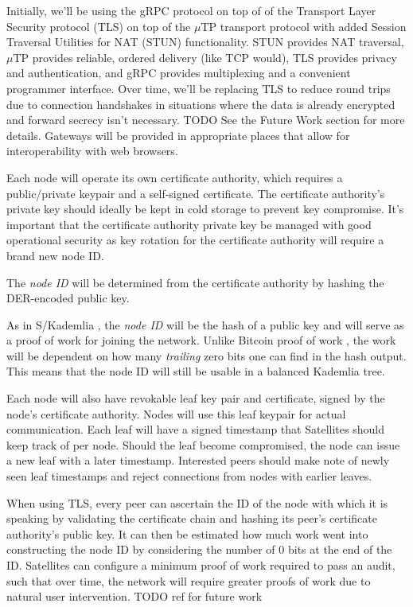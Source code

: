 \documentclass[11pt,fleqn,openany]{book}
\newcommand{\todo}[1]{{\color{red} TODO #1 }}
\begin{document}
Initially, we'll be using the gRPC \cite{grpc} protocol on top of of the
Transport Layer Security protocol (TLS) on top of the $\mu$TP
\cite{utp} transport protocol with added Session Traversal Utilities for NAT
(STUN) functionality. STUN provides NAT traversal, $\mu$TP provides reliable,
ordered delivery (like TCP would), TLS provides privacy and authentication,
and gRPC provides multiplexing and a convenient programmer interface.
Over time, we'll be replacing TLS to
reduce round trips due to connection handshakes in situations where the data is
already encrypted and forward secrecy isn't necessary. \todo{} See the Future
Work section for more details. Gateways will be provided in appropriate places
that allow for interoperability with web browsers.

Each node will operate its own certificate authority, which requires a
public/private keypair and a self-signed certificate. The certificate
authority's private key should ideally be kept in cold storage to prevent key
compromise.
It's important that the certificate authority private key be managed with good
operational security as key rotation for the certificate authority will require
a brand new node ID.

The {\em node ID} will be determined from the certificate authority
by hashing the DER-encoded public key.

As in S/Kademlia \cite{skad}, the {\em node ID} will be the hash of a public key
and will serve as a proof of work for joining the network. Unlike Bitcoin proof
of work \cite{bitcoin}, the work will be dependent on how many {\em trailing}
zero bits one can find in the hash output. This means that the node ID will
still be usable in a balanced Kademlia \cite{kad} tree.

Each node will also have revokable leaf key pair and certificate, signed by
the node's certificate authority. Nodes will use this leaf keypair for actual
communication. Each leaf will have a signed timestamp that Satellites should
keep track of per node. Should the leaf become compromised, the node can issue
a new leaf with a later timestamp. Interested peers should make note of newly
seen leaf timestamps and reject connections from nodes with earlier leaves.

When using TLS, every peer can ascertain the ID of the node with which it is
speaking by validating the certificate chain and hashing its peer's
certificate authority's public key. It can then be estimated how much work went
into constructing the node ID by considering the number of 0 bits at the end of
the ID. Satellites can configure a minimum proof of work required to pass an
audit, such that over time, the network will require greater proofs of work
due to natural user intervention. \todo{ref for future work}
\end{document}
